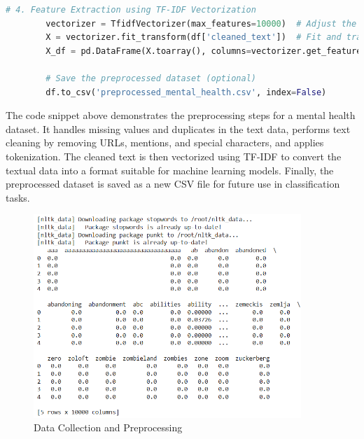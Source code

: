     \begin{tcolorbox}[colback=gray!5!white, colframe=gray!80!black, boxrule=0.5pt, title=Text Preprocessing]
    \begin{lstlisting}[language=Python]
        # 4. Feature Extraction using TF-IDF Vectorization
        vectorizer = TfidfVectorizer(max_features=10000)  # Adjust the max_features
        X = vectorizer.fit_transform(df['cleaned_text'])  # Fit and transform the cleaned text data
        X_df = pd.DataFrame(X.toarray(), columns=vectorizer.get_feature_names_out())  # Convert the result to a DataFrame for easier understanding
    
        # Save the preprocessed dataset (optional)
        df.to_csv('preprocessed_mental_health.csv', index=False)
        \end{lstlisting}
    \end{tcolorbox}
    
    \noindent
    The code snippet above demonstrates the preprocessing steps for a mental health dataset. It handles missing values and duplicates in the text data, performs text cleaning by removing URLs, mentions, and special characters, and applies tokenization. The cleaned text is then vectorized using TF-IDF to convert the textual data into a format suitable for machine learning models. Finally, the preprocessed dataset is saved as a new CSV file for future use in classification tasks.
    
    \begin{figure}[h!]  
        \centering
        \includegraphics[width=0.9\textwidth]{Images/Data Cleaning and Preprocessing.png}  
        \caption{Data Collection and Preprocessing}
        \label{Data Collection and Preprocessing}  %
    \end{figure}

